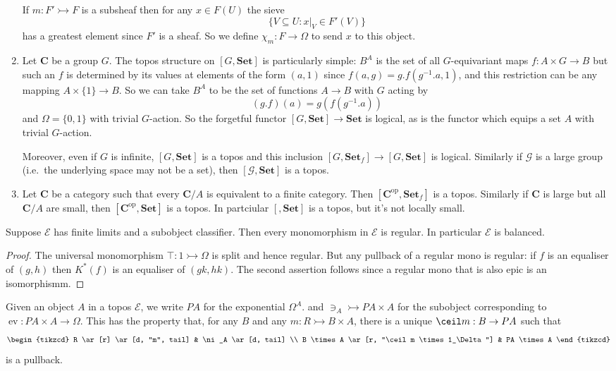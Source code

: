 \documentclass[a4paper]{article}
\renewcommand{\c}[1]{\mathbf{#1}}
\newcommand{\Set}{{\c{Set}}}
\newcommand{\mono}{\rightarrowtail}
\DeclareMathOperator{\ev}{ev} %
\begin{document}
\begin{eg}
\begin{enumerate}
    If \(m: F' \mono F\) is a subsheaf then for any \(x \in F(U)\) the sieve
    \[
      \{V \subseteq U: x|_V \in F'(V)\}
    \]
    has a greatest element since \(F'\) is a sheaf. So we define \(\chi_m: F \to \Omega\) to send \(x\) to this object.
  \item Let \(\c C\) be a group \(G\). The topos structure on \([G, \Set]\) is particularly simple: \(B^A\) is the set of all \(G\)-equivariant maps \(f: A \times G \to B\) but such an \(f\) is determined by its values at elements of the form \((a, 1)\) since \(f(a, g) = g . f(g^{-1} . a, 1)\), and this restriction can be any mapping \(A \times \{1\} \to B\). So we can take \(B^A\) to be the set of functions \(A \to B\) with \(G\) acting by
    \[
      (g . f) (a) = g(f(g^{-1} . a))
    \]
    and \(\Omega = \{0, 1\}\) with trivial \(G\)-action. So the forgetful functor \([G, \Set] \to \Set\) is logical, as is the functor which equips a set \(A\) with trivial \(G\)-action.

    Moreover, even if \(G\) is infinite, \([G, \Set]\) is a topos and this inclusion \([G, \Set_f] \to [G, \Set]\) is logical. Similarly if \(\mathcal G\) is a large group (i.e.\ the underlying space may not be a set), then \([\mathcal G, \Set]\) is a topos.
  \item Let \(\c C\) be a category such that every \(\c C/A\) is equivalent to a finite category. Then \([\c C^{\text{op}}, \Set_f]\) is a topos. Similarly if \(\c C\) is large but all \(\c C/A\) are small, then \([\c C^{\text{op}}, \Set]\) is a topos. In partciular \([, \Set]\) is a topos, but it's not locally small.
  \end{enumerate}
\end{eg}

\begin{lemma}
  Suppose \(\mathcal E\) has finite limits and a subobject classifier. Then every monomorphism in \(\mathcal E\) is regular. In particular \(\mathcal E\) is balanced.
\end{lemma}

\begin{proof}
  The universal monomorphism \(\top: 1 \mono \Omega\) is split and hence regular. But any pullback of a regular mono is regular: if \(f\) is an equaliser of \((g, h)\) then \(K^*(f)\) is an equaliser of \((gk, hk)\). The second assertion follows since a regular mono that is also epic is an isomorphismm.
\end{proof}

Given an object \(A\) in a topos \(\mathcal E\), we write \(PA\) for the exponential \(\Omega^A\). and \(\ni_A \mono PA \times A\) for the subobject corresponding to \(\ev: PA \times A \to \Omega\). This has the property that, for any \(B\) and any \(m: R \mono B \times A\), there is a unique \(\ceil m: B \to PA\) %
such that
\[
  \begin{tikzcd}
    R \ar[r] \ar[d, "m", tail] & \ni_A \ar[d, tail] \\
    B \times A \ar[r, "\ceil m \times 1_\Delta"] & PA \times A
  \end{tikzcd}
\]
is a pullback.
\end{document}
